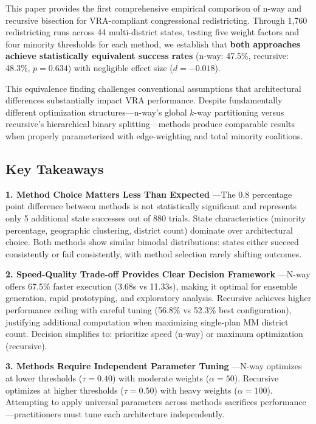 This paper provides the first comprehensive empirical comparison of n-way and recursive bisection for VRA-compliant congressional redistricting. Through 1,760 redistricting runs across 44 multi-district states, testing five weight factors and four minority thresholds for each method, we establish that \textbf{both approaches achieve statistically equivalent success rates} (n-way: 47.5\%, recursive: 48.3\%, $p=0.634$) with negligible effect size ($d=-0.018$).

This equivalence finding challenges conventional assumptions that architectural differences substantially impact VRA performance. Despite fundamentally different optimization structures—n-way's global $k$-way partitioning versus recursive's hierarchical binary splitting—methods produce comparable results when properly parameterized with edge-weighting and total minority coalitions.

\subsection{Key Takeaways}

\textbf{1. Method Choice Matters Less Than Expected} —The 0.8 percentage point difference between methods is not statistically significant and represents only 5 additional state successes out of 880 trials. State characteristics (minority percentage, geographic clustering, district count) dominate over architectural choice. Both methods show similar bimodal distributions: states either succeed consistently or fail consistently, with method selection rarely shifting outcomes.

\textbf{2. Speed-Quality Trade-off Provides Clear Decision Framework} —N-way offers 67.5\% faster execution (3.68s vs 11.33s), making it optimal for ensemble generation, rapid prototyping, and exploratory analysis. Recursive achieves higher performance ceiling with careful tuning (56.8\% vs 52.3\% best configuration), justifying additional computation when maximizing single-plan MM district count. Decision simplifies to: prioritize speed (n-way) or maximum optimization (recursive).

\textbf{3. Methods Require Independent Parameter Tuning} —N-way optimizes at lower thresholds ($\tau=0.40$) with moderate weights ($\alpha=50$). Recursive optimizes at higher thresholds ($\tau=0.50$) with heavy weights ($\alpha=100$). Attempting to apply universal parameters across methods sacrifices performance—practitioners must tune each architecture independently.

